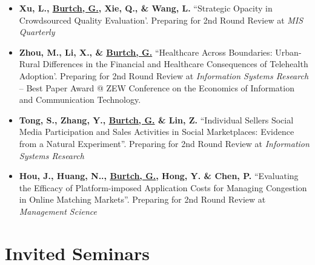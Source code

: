 \documentclass[10.5pt,letterpaper,sans]{moderncv}        %
\begin{document}
\begin{itemize}[leftmargin=!,labelindent=5pt,itemindent=-15pt]
\item \textbf{Xu, L., \underline{Burtch, G.}, Xie, Q., \& Wang, L.} ``Strategic Opacity in Crowdsourced Quality Evaluation'. Preparing for 2nd Round Review at \textit{MIS Quarterly}

\item \textbf{Zhou, M., Li, X., \& \underline{Burtch, G.}} ``Healthcare Across Boundaries: Urban-Rural Differences in the Financial and Healthcare Consequences of Telehealth Adoption'. Preparing for 2nd Round Review at \textit{Information Systems Research} \\-- Best Paper Award @ ZEW Conference on the Economics of Information and Communication Technology.

\item \textbf{Tong, S., Zhang, Y., \underline{Burtch, G.} \& Lin, Z.} ``Individual Sellers Social Media Participation and Sales Activities in Social Marketplaces: Evidence from a Natural Experiment''. Preparing for 2nd Round Review at \textit{Information Systems Research} 

\item \textbf{Hou, J., Huang, N.., \underline{Burtch, G.}, Hong, Y. \& Chen, P.} ``Evaluating the Efficacy of Platform-imposed Application Costs for Managing Congestion in Online Matching Markets''. Preparing for 2nd Round Review at \textit{Management Science} 

\end{itemize}

\section{Invited Seminars}
\end{document}

